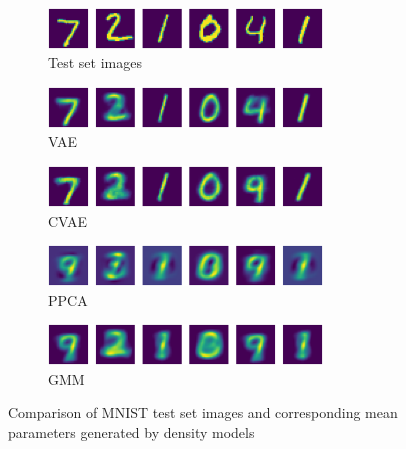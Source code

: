 \begin{figure}[!h]
	\begin{subfigure}[t]{1\textwidth}
		\centering
		\includegraphics[width = 0.8\textwidth]{figures/ppca/real}
		\caption{Test set images}
		\label{fig:ppca:real}
	\end{subfigure}
	\begin{subfigure}[t]{1\textwidth}
		\centering
		\includegraphics[width = 0.8\textwidth]{figures/vae/mean}
		\caption{VAE}
		\label{fig:vae:mean}
	\end{subfigure}
	\begin{subfigure}[t]{1\textwidth}
		\centering
		\includegraphics[width = 0.8\textwidth]{figures/cvae/mean}
		\caption{CVAE}
		\label{fig:cvae:mean}
	\end{subfigure}
	\begin{subfigure}[t]{1\textwidth}
		\centering
		\includegraphics[width = 0.8\textwidth]{figures/ppca/mean}
		\caption{PPCA}
		\label{fig:ppca:mean}
	\end{subfigure}
	\begin{subfigure}[t]{1\textwidth}
		\centering
		\includegraphics[width = 0.8\textwidth]{figures/gmm/mean}
		\caption{GMM}
		\label{fig:gmm:mean}
	\end{subfigure}
	\caption{Comparison of MNIST test set images and corresponding mean parameters generated by density models}
	\label{fig:mean}
\end{figure}

